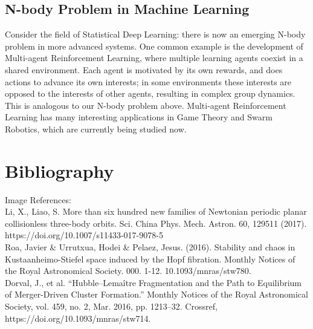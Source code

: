 \documentclass{article}
\begin{document}
\subsection{N-body Problem in Machine Learning}
Consider the field of Statistical Deep Learning: there is now an emerging N-body problem in more advanced systems. One common example is the development of Multi-agent Reinforcement Learning, where multiple learning agents coexist in a shared environment. Each agent is motivated by its own rewards, and does actions to advance its own interests; in some environments these interests are opposed to the interests of other agents, resulting in complex group dynamics. This is analogous to our N-body problem above. Multi-agent Reinforcement Learning has many interesting applications in Game Theory and Swarm Robotics, which are currently being studied now. \\

\section{Bibliography}
Image References: \\

\noindent [1a] Li, X., Liao, S. More than six hundred new families of Newtonian periodic planar collisionless three-body orbits. Sci. China Phys. Mech. Astron. 60, 129511 (2017). https://doi.org/10.1007/s11433-017-9078-5 \\

\noindent [1b] Roa, Javier & Urrutxua, Hodei & Pelaez, Jesus. (2016). Stability and chaos in Kustaanheimo-Stiefel space induced by the Hopf fibration. Monthly Notices of the Royal Astronomical Society. 000. 1-12. 10.1093/mnras/stw780. \\

\noindent [2] Dorval, J., et al. “Hubble–Lemaître Fragmentation and the Path to Equilibrium of Merger-Driven Cluster Formation.” Monthly Notices of the Royal Astronomical Society, vol. 459, no. 2, Mar. 2016, pp. 1213–32. Crossref, https://doi.org/10.1093/mnras/stw714.
\end{document}
